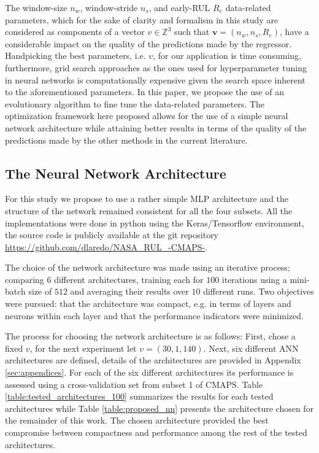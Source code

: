 \documentclass[12pt]{IEEEtran}%
\begin{document}
The window-size $n_w$, window-stride $n_s$, and early-RUL $R_e$ data-related parameters, which for the sake of clarity and formalism in this study are considered as components of a vector $v \in \mathbb{Z}^3$ such that $\mathbf{v} = (n_w, n_s, R_e)$, have a considerable impact on the quality of the predictions made by the regressor. Handpicking the best parameters, i.e. $v$, for our application is time consuming, furthermore, grid search approaches as the ones used for hyperparameter tuning in neural networks is computationally expensive given the search space inherent to the aforementioned parameters. In this paper, we propose the use of an evolutionary algorithm to fine tune the data-related parameters. The optimization framework here proposed allows for the use of a simple neural network architecture while attaining better results in terms of the quality of the predictions made by the other methods in the current literature.

\subsection{The Neural Network Architecture}

For this study we propose to use a rather simple MLP architecture and the structure of the network remained consistent for all the four subsets. All the implementations were done in python using the Keras/Tensorflow environment, the source code is publicly available at the git repository \url{https://github.com/dlaredo/NASA_RUL_-CMAPS-}. 

The choice of the network architecture was made using an iterative process; comparing 6 different architectures, training each for $100$ iterations using a mini-batch size of $512$ and averaging their results over $10$ different runs. Two objectives were pursued: that the architecture was compact, e.g. in terms of layers and neurons within each layer and that the performance indicators were minimized. 

The process for choosing the network architecture is as follows: First, chose a fixed $v$, for the next experiment let $v= (30, 1, 140)$. Next, six different ANN architectures are defined, details of the architectures are provided in Appendix \ref{sec:appendices}. For each of the six different architectures its performance is assessed using a cross-validation set from subset 1 of CMAPS. Table \ref{table:tested_architectures_100} summarizes the results for each tested architectures while Table \ref{table:proposed_nn} presents the architecture chosen for the remainder of this work. The chosen architecture provided the best compromise between compactness and performance among the rest of the tested architectures. 
\end{document}
